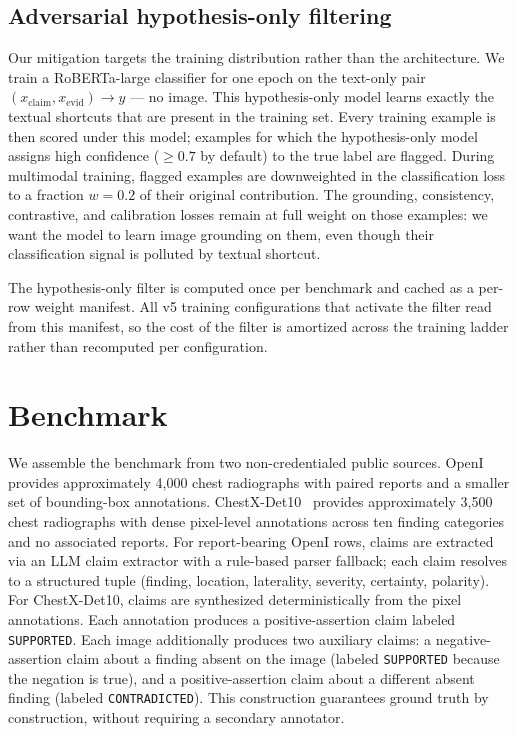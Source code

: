 \documentclass[11pt]{article}
\begin{document}
\subsection{Adversarial hypothesis-only filtering}
\label{sec:ho-filter}

Our mitigation targets the training distribution rather than the architecture. We train a RoBERTa-large classifier for one epoch on the text-only pair $(x_{\text{claim}}, x_{\text{evid}}) \to y$ --- no image. This hypothesis-only model learns exactly the textual shortcuts that are present in the training set. Every training example is then scored under this model; examples for which the hypothesis-only model assigns high confidence ($\geq 0.7$ by default) to the true label are flagged. During multimodal training, flagged examples are downweighted in the classification loss to a fraction $w = 0.2$ of their original contribution. The grounding, consistency, contrastive, and calibration losses remain at full weight on those examples: we want the model to learn image grounding on them, even though their classification signal is polluted by textual shortcut.

The hypothesis-only filter is computed once per benchmark and cached as a per-row weight manifest. All v5 training configurations that activate the filter read from this manifest, so the cost of the filter is amortized across the training ladder rather than recomputed per configuration.

\section{Benchmark}

We assemble the benchmark from two non-credentialed public sources. OpenI~\cite{openi} provides approximately 4,000 chest radiographs with paired reports and a smaller set of bounding-box annotations. ChestX-Det10~\cite{chestxdet10} provides approximately 3,500 chest radiographs with dense pixel-level annotations across ten finding categories and no associated reports. For report-bearing OpenI rows, claims are extracted via an LLM claim extractor with a rule-based parser fallback; each claim resolves to a structured tuple (finding, location, laterality, severity, certainty, polarity). For ChestX-Det10, claims are synthesized deterministically from the pixel annotations. Each annotation produces a positive-assertion claim labeled \texttt{SUPPORTED}. Each image additionally produces two auxiliary claims: a negative-assertion claim about a finding absent on the image (labeled \texttt{SUPPORTED} because the negation is true), and a positive-assertion claim about a different absent finding (labeled \texttt{CONTRADICTED}). This construction guarantees ground truth by construction, without requiring a secondary annotator.
\end{document}
